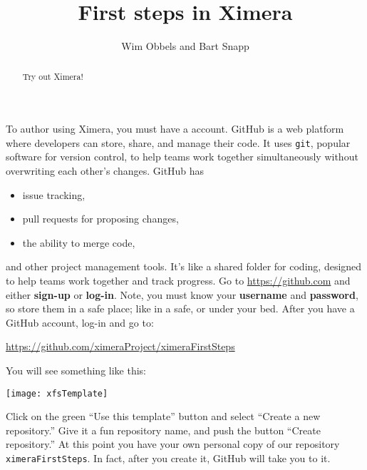 \documentclass{ximera}
\author{Wim Obbels and Bart Snapp}
\title{First steps in Ximera}
\begin{document}
        \begin{abstract}
            Try out Ximera!
        \end{abstract}
        \maketitle

        To author using Ximera, you must have a 
        account. GitHub is a web platform where developers can store, share,
        and manage
        their code. It uses \verb!git!, popular software for version control,
        to help
        teams work together simultaneously without overwriting each other's
        changes.
        GitHub has
        \begin{itemize}
            \item issue tracking,
            \item pull requests for proposing changes,
            \item the ability to merge code,
        \end{itemize}
        and other project management tools. It's like a shared folder for
        coding, designed to
        help teams work together and track progress. Go to
        \url{https://github.com} and
        either \textbf{sign-up} or \textbf{log-in}. Note, you must know your \textbf{username}
        and
        \textbf{password}, so store them in a safe place; like in a safe, or
        under your
        bed. After you have a GitHub account, log-in and go to:
        \begin{center}
            \url{https://github.com/ximeraProject/ximeraFirstSteps}
        \end{center}
        You will see something like this:
        \pdfOnly{\end{multicols}}\enlargethispage{1.5em}
\begin{image}
    \texttt{[image: xfsTemplate]}
\end{image}
\newpage{}
Click on the green ``Use this template'' button and select ``Create a
new repository.'' Give it a fun repository name, and push the button \columnbreak
``Create repository.'' At this point you have your own personal copy of our repository
\verb!ximeraFirstSteps!. In fact, after you create it, GitHub will take you to it. \pdfOnly{\end{multicols}}
\end{document}
